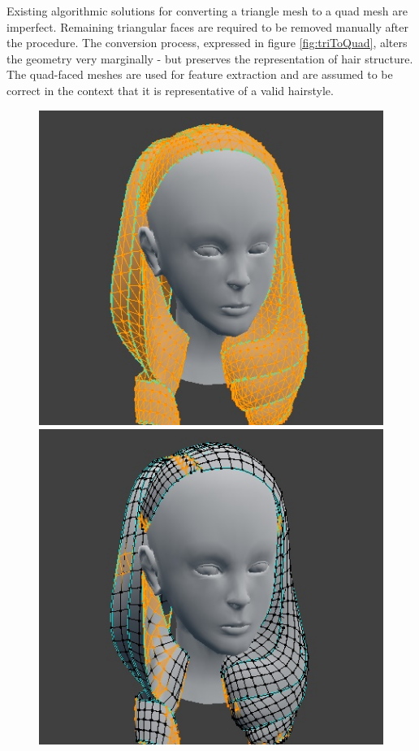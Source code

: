 \documentclass[ %
author={Dillon Keith Diep},
supervisor={Dr. Carl Henrik Ek},
degree={MEng},
title={ART-CG Hair:},
subtitle={Assisted Real-time Content Generation of Stylised Virtual Hair},
type={Research},
year={2017} ]{dissertation}
\begin{document}
	Existing algorithmic solutions for converting a triangle mesh to a quad mesh are imperfect. Remaining triangular faces are required to be removed manually after the procedure. The conversion process, expressed in figure \ref{fig:triToQuad}, alters the geometry very marginally - but preserves the representation of hair structure. The quad-faced meshes are used for feature extraction and are assumed to be correct in the context that it is representative of a valid hairstyle. 
	
	\begin{figure}[!h]
		\centering
		\includegraphics[scale=2]{images/triToQuad1}
		\includegraphics[scale=2]{images/triToQuad2}

\end{figure}
\end{document}
